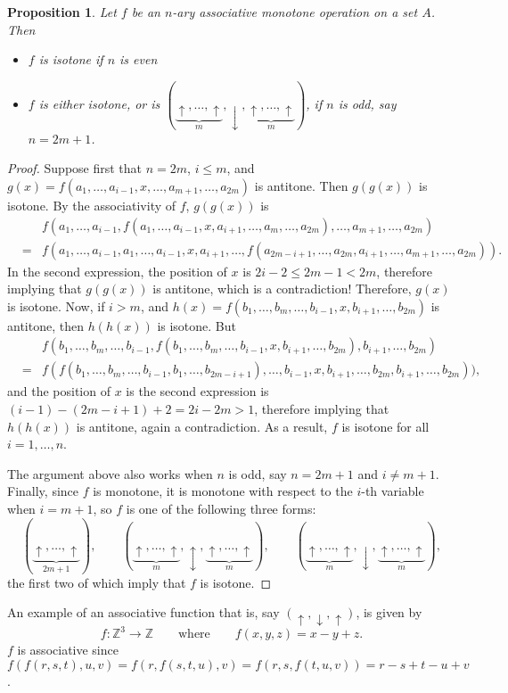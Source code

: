 \documentclass[12pt]{article}
\newtheorem{prop}{Proposition}
\begin{document}
\begin{prop}  Let $f$ be an $n$-ary associative monotone operation on a set $A$.  Then
\begin{itemize}
\item $f$ is isotone if $n$ is even
\item $f$ is either isotone, or is $(\underbrace{\uparrow,\ldots,\uparrow}_{m}, \downarrow,\underbrace{\uparrow,\ldots,\uparrow}_{m})$, if $n$ is odd, say $n=2m+1$.
\end{itemize}
\end{prop}
\begin{proof}
Suppose first that $n=2m$, $i\le m$, and $g(x)=f(a_1,\ldots, a_{i-1},x,\ldots, a_{m+1}, \ldots, a_{2m})$ is antitone.  Then $g(g(x))$ is isotone.  By the associativity of $f$, $g(g(x))$ is
\begin{eqnarray*}
&& f(a_1,\ldots, a_{i-1},f(a_1,\ldots, a_{i-1},x,a_{i+1},\ldots, a_m, \ldots, a_{2m}),\ldots, a_{m+1}, \ldots, a_{2m})\\
&=& f(a_1,\ldots, a_{i-1},a_1,\ldots, a_{i-1},x,a_{i+1},\ldots, f(a_{2m-i+1}, \ldots, a_{2m},a_{i+1},\ldots, a_{m+1}, \ldots, a_{2m})).
\end{eqnarray*}
In the second expression, the position of $x$ is $2i-2\le 2m-1 < 2m$, therefore implying that $g(g(x))$ is antitone, which is a contradiction!  Therefore, $g(x)$ is isotone.
Now, if $i>m$, and $h(x)=f(b_1,\ldots, b_m, \ldots, b_{i-1}, x, b_{i+1},\ldots, b_{2m})$ is antitone, then $h(h(x))$ is isotone.  But 
\begin{eqnarray*}
&& f(b_1,\ldots, b_m, \ldots, b_{i-1}, f(b_1,\ldots, b_m, \ldots, b_{i-1}, x, b_{i+1},\ldots, b_{2m}), b_{i+1}, \ldots, b_{2m})\\
&=& f(f(b_1,\ldots, b_m, \ldots, b_{i-1},b_1,\ldots, b_{2m-i+1}), \ldots, b_{i-1},x,b_{i+1},\ldots, b_{2m}, b_{i+1}, \ldots, b_{2m})),
\end{eqnarray*}
and the position of $x$ is the second expression is $(i-1)-(2m-i+1)+2=2i-2m>1$, therefore implying that $h(h(x))$ is antitone, again a contradiction.  As a result, $f$ is isotone for all $i=1,\ldots, n$.

The argument above also works when $n$ is odd, say $n=2m+1$ and $i\ne m+1$.  Finally, since $f$ is monotone, it is monotone with respect to the $i$-th variable when $i=m+1$, so $f$ is one of the following three forms: 
$$(\underbrace{\uparrow,\ldots,\uparrow}_{2m+1}), \qquad (\underbrace{\uparrow,\ldots,\uparrow}_{m}, \updownarrow,\underbrace{\uparrow,\ldots,\uparrow}_{m}), \qquad (\underbrace{\uparrow,\ldots,\uparrow}_{m}, \downarrow,\underbrace{\uparrow,\ldots,\uparrow}_{m}),$$ the first two of which imply that $f$ is isotone.
\end{proof}
An example of an associative function that is, say $(\uparrow,\downarrow,\uparrow)$, is given by $$f:\mathbb{Z}^3 \to \mathbb{Z}\qquad\mbox{where}\qquad f(x,y,z)=x-y+z.$$
$f$ is associative since $f(f(r,s,t),u,v)=f(r,f(s,t,u),v)=f(r,s,f(t,u,v))=r-s+t-u+v$.
\end{document}
